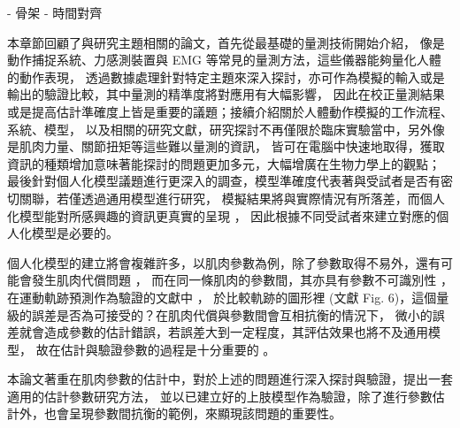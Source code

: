 - 骨架
- 時間對齊

本章節回顧了與研究主題相關的論文，首先從最基礎的量測技術開始介紹，
像是動作捕捉系統、力感測裝置與 EMG 等常見的量測方法，這些儀器能夠量化人體的動作表現，
透過數據處理針對特定主題來深入探討，亦可作為模擬的輸入或是輸出的驗證比較，其中量測的精準度將對應用有大幅影響，
因此在校正量測結果或是提高估計準確度上皆是重要的議題；接續介紹關於人體動作模擬的工作流程、系統、模型，
以及相關的研究文獻，研究探討不再僅限於臨床實驗當中，另外像是肌肉力量、關節扭矩等這些難以量測的資訊，
皆可在電腦中快速地取得，獲取資訊的種類增加意味著能探討的問題更加多元，大幅增廣在生物力學上的觀點；
最後針對個人化模型議題進行更深入的調查，模型準確度代表著與受試者是否有密切關聯，若僅透過通用模型進行研究，
模擬結果將與實際情況有所落差，而個人化模型能對所感興趣的資訊更真實的呈現 \cite{akhundov2022subject}，
因此根據不同受試者來建立對應的個人化模型是必要的。

個人化模型的建立將會複雜許多，以肌肉參數為例，除了參數取得不易外，還有可能會發生肌肉代償問題 \cite{xiao2010sensitivity}，
而在同一條肌肉的參數間，其亦具有參數不可識別性 \cite{bujalski2018monte}，在運動軌跡預測作為驗證的文獻中 \cite{hinson2022sensitivity}，
於比較軌跡的圖形裡 (文獻 Fig. 6)，這個量級的誤差是否為可接受的？在肌肉代償與參數間會互相抗衡的情況下，
微小的誤差就會造成參數的估計錯誤，若誤差大到一定程度，其評估效果也將不及通用模型，
故在估計與驗證參數的過程是十分重要的 \cite{hicks2015my}。

本論文著重在肌肉參數的估計中，對於上述的問題進行深入探討與驗證，提出一套適用的估計參數研究方法，
並以已建立好的上肢模型作為驗證，除了進行參數估計外，也會呈現參數間抗衡的範例，來顯現該問題的重要性。

\clearpage